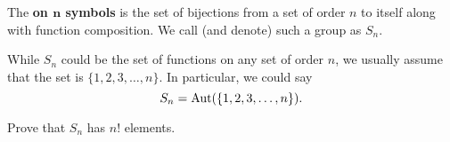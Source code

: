 \documentclass{ximera}
\begin{document}
\begin{definition}
  The  \textbf{on $\boldsymbol{n}$ symbols} is
  the set of bijections from a set of order $n$ to itself along with
  function composition. We call (and denote) such a group as $S_n$.
\end{definition}

\begin{remark}
  While $S_n$ could be the set of functions on any set of order $n$,
  we usually assume that the set is $\{1,2,3,\dots,n\}$. In
  particular, we could say
  \[
  S_n = \operatorname{Aut}(\{1,2,3,\dots,n\}).
  \]
\end{remark}

\begin{exercise}
  Prove that $S_n$ has $n!$ elements.
\end{exercise}
\end{document}
